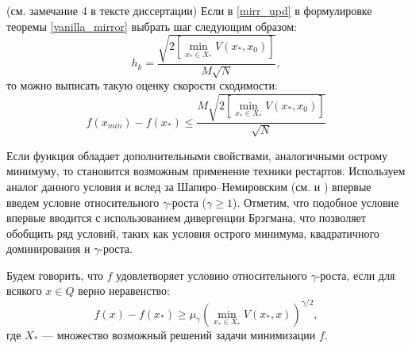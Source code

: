 \begin{remark} (см. замечание 4 в тексте диссертации)
    Если в \eqref{mirr_upd} в формулировке теоремы \ref{vanilla_mirror} выбрать шаг следующим образом:
    \begin{equation} \label{mirr_step}
        h_{k} = \frac{\sqrt{2 \left[\min\limits_{x_* \in X_*}{V(x_*, x_0)}\right] }}{M\sqrt{N}},
    \end{equation}
    то можно выписать такую оценку скорости сходимости:
    \begin{equation} \label{mirr_est}
        f(x_{min}) - f(x_*) \leq \frac{M\sqrt{2 \left[\min\limits_{x_* \in X_*}{V(x_*, x_0)}\right]}}{\sqrt{N}}
    \end{equation}
\end{remark}

Если функция обладает дополнительными свойствами, аналогичными острому минимуму,  то становится возможным применение техники рестартов. Используем аналог данного условия и вслед за Шапиро–Немировским (см. \cite{shapiro_2005} и \cite{shapiro_2021} ) впервые введем условие относительного $\gamma$-роста ($\gamma \geq 1$). Отметим, что подобное условие впервые вводится с использованием дивергенции Брэгмана, что позволяет обобщить ряд условий, таких как условия острого минимума, квадратичного доминирования и $\gamma$-роста.
\begin{definition}
   Будем говорить, что $f$ удовлетворяет условию относительного $\gamma$-роста, если для всякого $x \in Q$ верно неравенство:
   \begin{equation} \label{gamma-growth}
       f(x) - f(x_*) \geq \mu_{\gamma}\left(\min_{x_* \in X_*}{V(x_*,x)}\right)^{\gamma/2},
   \end{equation}
   где $X_*$ --- множество возможный решений задачи минимизации $f$. 
\end{definition}

